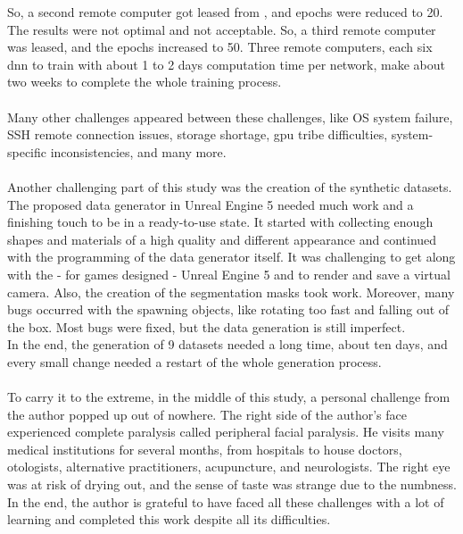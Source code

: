 		So, a second remote computer got leased from \cite{shadow}, and epochs were reduced to 20. The results were not optimal and not acceptable. So, a third remote computer was leased, and the epochs increased to 50. Three remote computers, each six \ac{dnn} to train with about 1 to 2 days computation time per network, make about two weeks to complete the whole training process. \\
		\\
		Many other challenges appeared between these challenges, like OS system failure, SSH remote connection issues, storage shortage, \ac{gpu} tribe difficulties,  system-specific inconsistencies, and many more.\\
		\\
		Another challenging part of this study was the creation of the synthetic datasets. The proposed data generator in Unreal Engine 5 needed much work and a finishing touch to be in a ready-to-use state. It started with collecting enough shapes and materials of a high quality and different appearance and continued with the programming of the data generator itself. It was challenging to get along with the - for games designed - Unreal Engine 5 and to render and save a virtual camera. Also, the creation of the segmentation masks took work. Moreover, many bugs occurred with the spawning objects, like rotating too fast and falling out of the box. Most bugs were fixed, but the data generation is still imperfect.\\
		In the end, the generation of 9 datasets needed a long time, about ten days, and every small change needed a restart of the whole generation process.\\
		\\
		To carry it to the extreme, in the middle of this study, a personal challenge from the author popped up out of nowhere. The right side of the author's face experienced complete paralysis called peripheral facial paralysis. He visits many medical institutions for several months, from hospitals to house doctors, otologists, alternative practitioners, acupuncture, and neurologists. The right eye was at risk of drying out, and the sense of taste was strange due to the numbness. \\
		In the end, the author is grateful to have faced all these challenges with a lot of learning and completed this work despite all its difficulties.
		





